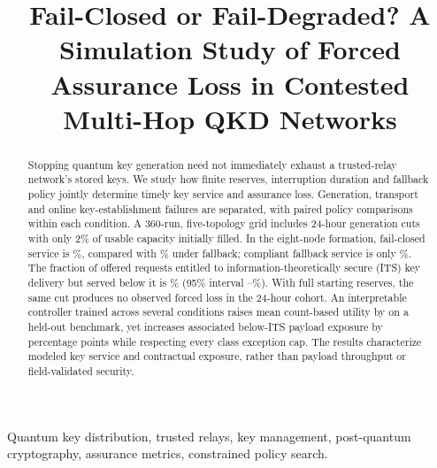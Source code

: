 \documentclass[conference,a4paper]{IEEEtran}
\begin{document}
\title{Fail-Closed or Fail-Degraded? A Simulation Study of Forced Assurance Loss in Contested Multi-Hop QKD Networks}
\author{
}
\maketitle

\begin{abstract}
Stopping quantum key generation need not immediately exhaust a trusted-relay network's stored keys. We study how finite reserves, interruption duration and fallback policy jointly determine timely key service and assurance loss. Generation, transport and online key-establishment failures are separated, with paired policy comparisons within each condition. A 360-run, five-topology grid includes 24-hour generation cuts with only 2\% of usable capacity initially filled. In the eight-node formation, fail-closed service is \MainClosed\%, compared with \MainDegraded\% under fallback; compliant fallback service is only \MainQualified\%. The fraction of offered requests entitled to information-theoretically secure (ITS) key delivery but served below it is \MainForced\% (95\% interval \MainForcedLo--\MainForcedHi\%). With full starting reserves, the same cut produces no observed forced loss in the 24-hour cohort. An interpretable controller trained across several conditions raises mean count-based utility by \LearnUtilityDelta{} on a held-out benchmark, yet increases associated below-ITS payload exposure by \LearnPayloadDelta{} percentage points while respecting every class exception cap. The results characterize modeled key service and contractual exposure, rather than payload throughput or field-validated security.
\end{abstract}
\begin{IEEEkeywords}
Quantum key distribution, trusted relays, key management, post-quantum cryptography, assurance metrics, constrained policy search.
\end{IEEEkeywords}
\end{document}

